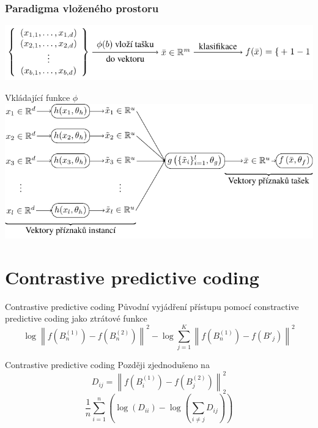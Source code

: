 \documentclass[10pt]{beamer}
\begin{document}
\begin{frame}[c]\frametitle{Paradigma vloženého prostoru}
	\centering
	\includegraphics{images/embedded_space_paradigm/embedded_space_paradigm.pdf}
\end{frame}

\begin{frame}{Vkládající funkce \( \phi \)}
	\centering
	\includegraphics[width=0.9\pagewidth]{images/embedding_function/embedding_function.pdf}
\end{frame}

\section{Contrastive predictive coding}

\begin{frame}{Contrastive predictive coding}
	Původní vyjádření přístupu pomocí constractive predictive coding jako ztrátové funkce
	\[ \log \left\lVert f \left( B_n^{(1)} \right) - f \left( B_n^{(2)} \right) \right\rVert^2 - \log \sum_{j = 1}^K \left\lVert f \left( B_n^{(1)} \right) - f \left( B'_j \right) \right\rVert^2 \]
\end{frame}

\begin{frame}{Contrastive predictive coding}
	Později zjednodušeno na
	\[ D_{ij} = \left\lVert f \left( B_i^{(1)} \right) - f \left( B_j^{(2)} \right) \right\rVert_2^2 \]
	\[ \frac{1}{n} \sum_{i = 1}^n \left( \log \left( D_{ii} \right) - \log \left( \sum_{i \neq j} D_{ij} \right) \right) \]
\end{frame}
\end{document}
